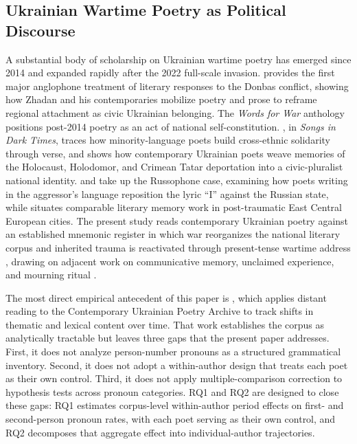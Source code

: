 \documentclass[12pt]{interact}
\theoremstyle{plain}%
\theoremstyle{definition}
\theoremstyle{remark}
\begin{document}
\subsection{Ukrainian Wartime Poetry as Political Discourse}

A substantial body of scholarship on Ukrainian wartime poetry has emerged since 2014 and expanded rapidly after the 2022 full-scale invasion. \citet{ilchuk2017hearing} provides the first major anglophone treatment of literary responses to the Donbas conflict, showing how Zhadan and his contemporaries mobilize poetry and prose to reframe regional attachment as civic Ukrainian belonging. The \emph{Words for War} anthology \citep{maksymchuk2017words} positions post-2014 poetry as an act of national self-constitution. \citet{Glaser2020}, in \emph{Songs in Dark Times}, traces how minority-language poets build cross-ethnic solidarity through verse, and \citet{glaser2023mine} shows how contemporary Ukrainian poets weave memories of the Holocaust, Holodomor, and Crimean Tatar deportation into a civic-pluralist national identity. \citet{kukulin2017the, kukulin2024writing} and \citet{parts2024in} take up the Russophone case, examining how poets writing in the aggressor's language reposition the lyric ``I'' against the Russian state, while \citet{blacker2019memory} situates comparable literary memory work in post-traumatic East Central European cities. The present study reads contemporary Ukrainian poetry against an established mnemonic register in which war reorganizes the national literary corpus and inherited trauma is reactivated through present-tense wartime address \citep{fussell2013the, hirsch2012the}, drawing on adjacent work on communicative memory, unclaimed experience, and mourning ritual \citep{winter1995sites, caruth1996unclaimed, assmann1995collective}.

The most direct empirical antecedent of this paper is \citet{glaser2024archive}, which applies distant reading to the Contemporary Ukrainian Poetry Archive to track shifts in thematic and lexical content over time. That work establishes the corpus as analytically tractable but leaves three gaps that the present paper addresses. First, it does not analyze person-number pronouns as a structured grammatical inventory. Second, it does not adopt a within-author design that treats each poet as their own control. Third, it does not apply multiple-comparison correction to hypothesis tests across pronoun categories. RQ1 and RQ2 are designed to close these gaps: RQ1 estimates corpus-level within-author period effects on first- and second-person pronoun rates, with each poet serving as their own control, and RQ2 decomposes that aggregate effect into individual-author trajectories.
\end{document}
